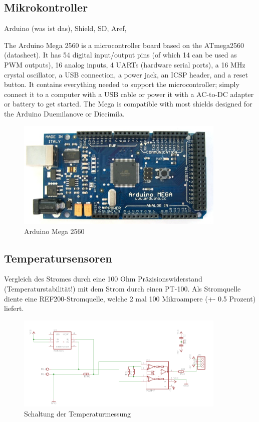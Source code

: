 \documentclass[a4paper,bibtotoc,oneside]{scrbook}
\begin{document}
\subsection{Mikrokontroller}\thispagestyle{empty}
Arduino (was ist das), Shield, SD, Aref,

The Arduino Mega 2560 is a microcontroller board based on the ATmega2560 (datasheet). It has 54 digital input/output pins (of which 14 can be used as PWM outputs), 16 analog inputs, 4 UARTs (hardware serial ports), a 16 MHz crystal oscillator, a USB connection, a power jack, an ICSP header, and a reset button. It contains everything needed to support the microcontroller; simply connect it to a computer with a USB cable or power it with a AC-to-DC adapter or battery to get started. The Mega is compatible with most shields designed for the Arduino Duemilanove or Diecimila.


\begin{figure}[htbp]
\centering
\includegraphics[width=100mm]{img/ArduinoMega.jpg}
\caption[Arduino Mega 2560]{Arduino Mega 2560}\label{ardu}
\end{figure}

\subsection{Temperatursensoren}\thispagestyle{empty}

Vergleich des Stromes durch eine 100 Ohm Präzisionswiderstand (Temperaturstabilität!) mit dem Strom durch einen PT-100. Als Stromquelle diente eine REF200-Stromquelle, welche 2 mal 100 Mikroampere (+- 0.5 Prozent) liefert.

\begin{figure}[htbp]
\centering
\includegraphics[width=100mm]{img/tmess.png}
\caption{Schaltung der Temperaturmessung}\label{tmess}
\end{figure}
\end{document}
